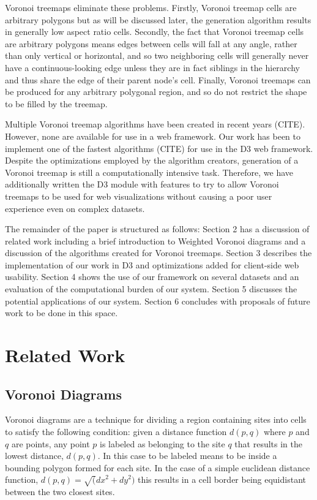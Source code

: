 \documentclass{acm_proc_article-sp}
\begin{document}
Voronoi treemaps eliminate these problems. Firstly, Voronoi treemap
cells are arbitrary polygons but as will be discussed later, the
generation algorithm results in generally low aspect ratio
cells. Secondly, the fact that Voronoi treemap cells are arbitrary
polygons means edges between cells will fall at any angle, rather
than only vertical or horizontal, and so two neighboring cells will
generally never have a continuous-looking edge unless they are in fact
siblings in the hierarchy and thus share the edge of their parent
node's cell. Finally, Voronoi treemaps can be produced for any
arbitrary polygonal region, and so do not restrict the shape to be
filled by the treemap.

Multiple Voronoi treemap algorithms have been created in recent years
(CITE). However, none are available for use in a web framework.  Our
work has been to implement one of the fastest algorithms (CITE) for
use in the D3 web framework. Despite the optimizations employed by the
algorithm creators, generation of a Voronoi treemap is still a
computationally intensive task. Therefore, we have additionally
written the D3 module with features to try to allow Voronoi treemaps
to be used for web visualizations without causing a poor user
experience even on complex datasets.

The remainder of the paper is structured as follows: Section 2 has a
discussion of related work including a brief introduction to Weighted Voronoi
diagrams and a discussion of the algorithms created for Voronoi
treemaps. Section 3 describes the implementation of our work in D3 and
optimizations added for client-side web usability. Section 4 shows the
use of our framework on several datasets and an evaluation of the
computational burden of our system. Section 5 discusses the potential
applications of our system. Section 6 concludes with proposals of
future work to be done in this space.

\section{Related Work}

\subsection{Voronoi Diagrams}
Voronoi diagrams are a technique for dividing a region containing
sites into cells to satisfy the following condition: given a distance
function $d(p, q)$ where $p$ and $q$ are points, any point $p$ is
labeled as belonging to the site $q$ that results in the lowest
distance, $d(p,q)$. In this case to be labeled means to be inside a
bounding polygon formed for each site. In the case of a simple
euclidean distance function, $d(p,q) = \sqrt({dx}^2 + {dy}^2)$ this
results in a cell border being equidistant between the two closest
sites. 
\end{document}
